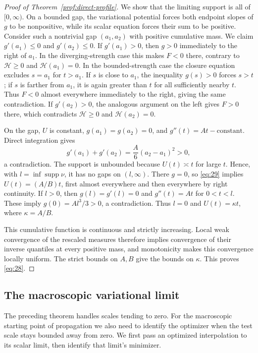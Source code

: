 \begin{proof}[Proof of Theorem~\ref{prof:direct-profile}]
We show that the limiting support is all of $[0,\infty)$. On a
bounded gap, the variational potential forces both endpoint slopes
of $g$ to be nonpositive, while its scalar equation forces their
sum to be positive. Consider such a nontrivial gap
$(a_1,a_2)$ with positive cumulative mass. We claim
$g'(a_1)\le0$ and $g'(a_2)\le0$.
If $g'(a_1)>0$, then $g>0$ immediately to the right of $a_1$.
In the diverging-strength case this makes $F<0$ there, contrary to
$\mathcal H\ge0$ and $\mathcal H(a_1)=0$. In the bounded-strength
case the closure equation excludes $s=a_1$ for $t>a_1$. If $s$ is
close to $a_1$, the inequality $g(s)>0$ forces $s>t$; if $s$ is
farther from $a_1$, it is again greater than $t$ for all sufficiently
nearby $t$. Thus $F<0$ almost everywhere immediately to the right,
giving the same contradiction. If $g'(a_2)>0$, the analogous
argument on the left gives $F>0$ there, which contradicts
$\mathcal H\ge0$ and $\mathcal H(a_2)=0$.

On the gap, $U$ is constant, $g(a_1)=g(a_2)=0$, and
$g''(t)=At-\text{constant}$. Direct integration gives
\[
 g'(a_1)+g'(a_2)=\frac A6(a_2-a_1)^2>0,
\]
a contradiction. The support is unbounded because $U(t)\asymp t$
for large $t$. Hence, with $l=\inf\operatorname{supp}\nu$, it has
no gaps on $(l,\infty)$. There $g=0$, so \eqref{eq:29} implies
$U(t)=(A/B)t$, first almost everywhere and then everywhere by
right continuity. If $l>0$, then $g(l)=g'(l)=0$ and $g''(t)=At$
for $0<t<l$. These imply $g(0)=Al^3/3>0$, a contradiction.
Thus $l=0$ and $U(t)=\kappa t$, where $\kappa=A/B$.

This cumulative function is continuous and strictly increasing.
Local weak convergence of the rescaled measures therefore implies
convergence of their inverse quantiles at every positive mass,
and monotonicity makes this convergence locally uniform. The
strict bounds on $A,B$ give the bounds on $\kappa$. This proves
\eqref{eq:28}.
\end{proof}

\subsection{The macroscopic variational limit}

The preceding theorem handles scales tending to zero. For the
macroscopic starting point of propagation we also need to identify
the optimizer when the test scale stays bounded away from zero.
We first pass an optimized interpolation to its scalar limit, then
identify that limit's minimizer.

